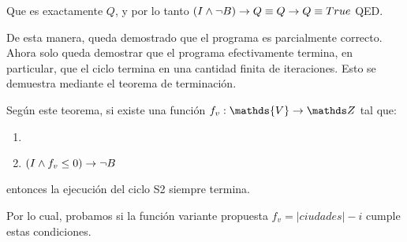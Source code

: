 \documentclass[10pt,a4paper]{article}
\begin{document}
Que es exactamente $Q$, y por lo tanto $(I \land \neg B) \rightarrow Q \equiv Q \rightarrow Q \equiv True$ QED.
\bigskip

De esta manera, queda demostrado que el programa es parcialmente correcto. Ahora solo queda demostrar que el programa efectivamente termina, en particular, que el ciclo termina en una cantidad finita de iteraciones. Esto se demuestra mediante el teorema de terminación.
\bigskip

Según este teorema, si existe una función $f_v: \mathds{V} \to \ent$ tal que:

\begin{enumerate}
	\item {}
	\item $(I \land f_v \leq 0) \rightarrow \neg B$
\end{enumerate}

entonces la ejecución del ciclo S2 siempre termina.
\bigskip

Por lo cual, probamos si la función variante propuesta $f_v = |ciudades| - i$ cumple estas condiciones.
\bigskip
\end{document}
